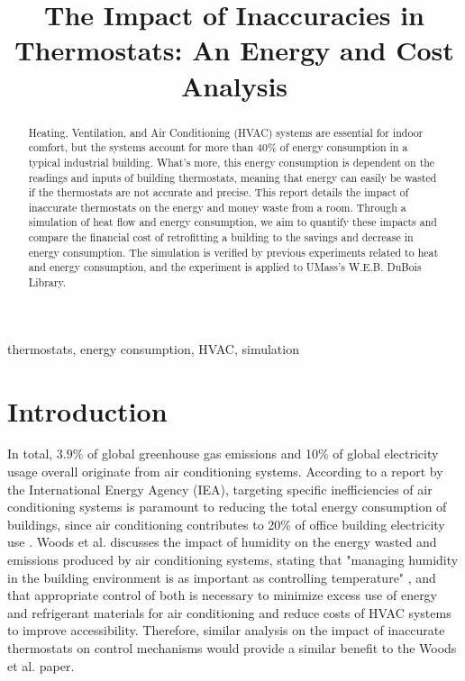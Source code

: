 \documentclass[conference,letterpaper]{IEEEtran}
\begin{document}

\title{The Impact of Inaccuracies in Thermostats: An Energy and Cost Analysis}
%
\author{
}

\maketitle

\begin{abstract}
Heating, Ventilation, and Air Conditioning (HVAC) systems are essential for indoor comfort, but the systems account for more than $40\%$ of energy consumption in a typical industrial building. What's more, this energy consumption is dependent on the readings and inputs of building thermostats, meaning that energy can easily be wasted if the thermostats are not accurate and precise. This report details the impact of inaccurate thermostats on the energy and money waste from a room. Through a simulation of heat flow and energy consumption, we aim to quantify these impacts and compare the financial cost of retrofitting a building to the savings and decrease in energy consumption. The simulation is verified by previous experiments related to heat and energy consumption, and the experiment is applied to UMass's W.E.B. DuBois Library.

\end{abstract}

\begin{IEEEkeywords}
thermostats, energy consumption, HVAC, simulation
\end{IEEEkeywords}

\section{Introduction}
\label{sec:Introduction}
In total, $3.9\%$ of global greenhouse gas emissions and 
10\% of global electricity usage overall originate from air conditioning systems. According to a report by the International Energy Agency (IEA), targeting specific inefficiencies of air conditioning systems is paramount to reducing the total energy consumption of buildings, since air conditioning contributes to 
20\%  of office building electricity use \cite{IEA_Future} . Woods et al. discusses the impact of humidity on the energy wasted and emissions produced by air conditioning systems, stating that "managing humidity in the building environment is as important as controlling temperature" \cite{woods_humiditys_2022}, and that appropriate control of both is necessary to minimize excess use of energy and refrigerant materials for air conditioning and reduce costs of HVAC systems to improve accessibility. Therefore, similar analysis on the impact of inaccurate thermostats on control mechanisms would provide a similar benefit to the Woods et al. paper. 
\end{document}
